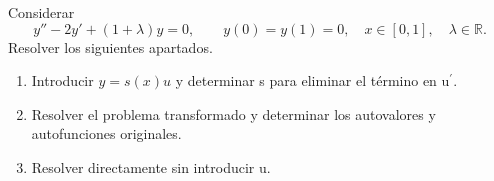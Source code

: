 Considerar
\[y''-2y'+(1+\lambda)y=0,\qquad y(0)=y(1)=0,\quad x\in[0,1],\quad \lambda\in\mathbb R.\]
Resolver los siguientes apartados.

\begin{enumerate}[label=(\alph*),ref=\alph*,leftmargin=*]
\item Introducir \(y=s(x)u\) y determinar s para eliminar el término en u\ensuremath{^{\prime}}.
\item Resolver el problema transformado y determinar los autovalores y autofunciones originales.
\item Resolver directamente sin introducir u.
\end{enumerate}
